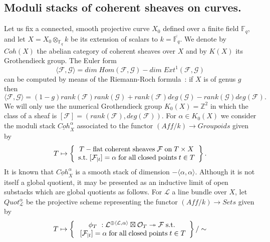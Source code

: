 \documentclass[a4paper,10pt]{amsart}
\def\Z{\mathbb{Z}}
\def\tto{\twoheadrightarrow}
\def\a{\alpha}
\def\fqb{\overline{\mathbb{F}_q}}
\numberwithin{equation}{section}
\begin{document}
\vspace{.3in}

\subsection{Moduli stacks of coherent sheaves on curves.}

\vspace{.15in}

Let us fix a connected, smooth projective curve $X_0$ defined over a finite field $\mathbb{F}_q$, and let $X=X_0 \otimes_{\mathbb{F}_q} k$ be its extension of scalars to $k=\fqb$. We denote by $Coh(X)$ the abelian category of coherent sheaves over $X$ and by $K(X)$ its Grothendieck group. The Euler form
$$\langle \mathcal{F},\mathcal{G}\rangle =dim\;Hom(\mathcal{F},\mathcal{G})-dim\;Ext^1(\mathcal{F},\mathcal{G})$$
can be computed by means of the Riemann-Roch formula~: if $X$ is of genus $g$ then
\begin{equation}\label{E:5Euler}
\langle \mathcal{F},\mathcal{G}\rangle=(1-g)rank(\mathcal{F})rank(\mathcal{G}) + rank(\mathcal{F})deg(\mathcal{G})-rank(\mathcal{G})deg(\mathcal{F}).
\end{equation}
We will only use the numerical Grothendieck group $K_0(X)= \Z^2$ in which the class of a sheaf is $[\mathcal{F}]= (rank(\mathcal{F}),deg(\mathcal{F}))$. For $\a \in K_0(X)$ we consider the moduli stack $\underline{Coh}^{\a}_X$ associated to the functor $(Aff/k) \to Groupoids$ given by
$$T \mapsto \left\{ 
\begin{array}{c}
T-\text{flat\;coherent\;sheaves\;}\mathcal{F}\text{\;on\;}T \times X \\ \text{s.t.}\;[\mathcal{F}_{|t}]=\alpha\;\text{for\;all\;closed\;points\;}t \in T
\end{array}\right\}.$$
It is known that $\underline{Coh}^{\a}_X$ is a smooth stack of dimension $-\langle \a, \a \rangle$. Although it is not itself a global quotient, it may be presented as an inductive limit of open substacks which are global quotients as follows. For $\mathcal{L}$ a line bundle over $X$, let $Quot_{\mathcal{L}}^{\a}$ be the projective scheme representing the functor $(Aff/k) \to Sets$ given by
$$T \mapsto \left\{ 
\begin{array}{c}
\phi_T~:\mathcal{L}^{\oplus \langle \mathcal{L},\a\rangle}\boxtimes \mathcal{O}_T \tto \mathcal{F}\;\text{s.t.}\\ \;[\mathcal{F}_{|t}]=\alpha\;\text{for\;all\;closed\;points\;}t \in T
\end{array}\right\}\huge{/}\sim$$
\end{document}
